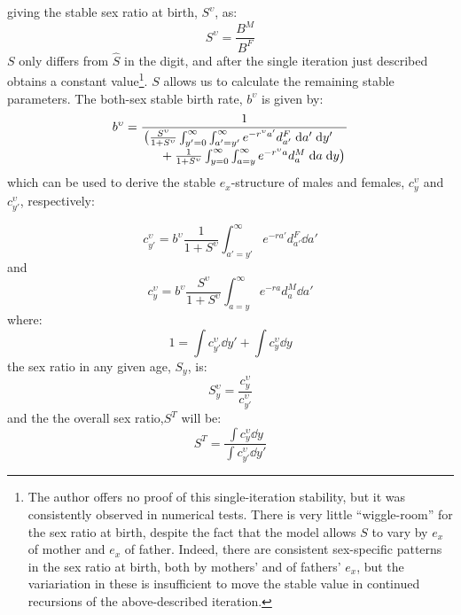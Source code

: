 giving the stable sex ratio at birth, $S^\upsilon$, as:
\begin{equation}
S^\upsilon = \frac{B^M}{B^F}
\end{equation}
$S$ only differs from $\hat{S}$ in the  digit, and after the single
iteration just described obtains a constant value\footnote{The author offers
no proof of this single-iteration stability, but it was consistently observed
in numerical tests. There is very little ``wiggle-room'' for the sex ratio at
birth, despite the fact that the model allows $S$ to vary by $e_x$ of mother and
$e_x$ of father. Indeed, there are consistent sex-specific patterns in the sex ratio
at birth, both by mothers' and of fathers' $e_x$, but the
variariation in these is insufficient to move the stable value in continued
recursions of the above-described iteration.}. $S$ allows us to calculate the
remaining stable parameters. The both-sex stable birth rate, $b^\upsilon$ is given by:
\begin{equation}
b^\upsilon = \frac{1}{
            \splitfrac{\big(\frac{S^\upsilon}{1+S^\upsilon} \int _{y'=0}^\infty
            \int _{a'=y'}^\infty e^{-r^\upsilon a'} d_{a'}^F \dd a' \dd y'}{ + 
             \frac{1}{1+S^\upsilon} \int _{y=0}^\infty \int _{a=y}^\infty
             e^{-r^\upsilon a} d_{a}^M \dd a \dd y\big)}  }                   
\end{equation}
which can be used to derive the stable $e_x$-structure of males and females,
$c_y^\upsilon$ and $c_{y'}^\upsilon$, respectively:

\begin{equation}
c_{y'}^\upsilon = b^\upsilon \frac{1}{1+S^\upsilon} \int _{a'=y'}^\infty
e^{-ra'} d_{a'}^F \dd a'
\end{equation}
and
\begin{equation}
c_{y}^\upsilon = b^\upsilon \frac{S^\upsilon}{1+S^\upsilon} \int _{a=y}^\infty
e^{-ra} d_{a}^M \dd a'
\end{equation}
where:
\begin{equation}
1 = \int c_{y'}^\upsilon \dd y' + \int c_{y}^\upsilon \dd y
\end{equation}
the sex ratio in any given age, $S_y$, is:
\begin{equation}
S_y^\upsilon = \frac{c_{y}^\upsilon}{c_{y'}^\upsilon}
\end{equation}
and the the overall sex ratio,$S^T$ will be:
\begin{equation}
S^T= \frac{\int c_{y}^\upsilon \dd y}{\int c_{y'}^\upsilon \dd y'}
\end{equation}
